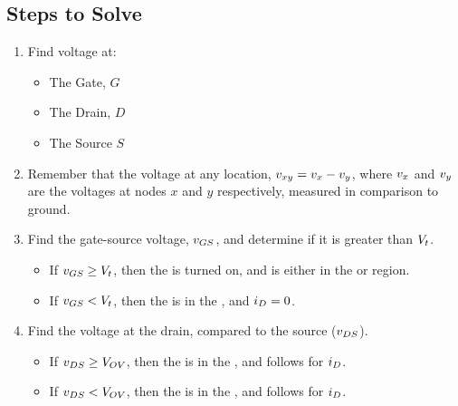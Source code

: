 \subsection{Steps to Solve}\label{subsec:Steps_to_Solve}
\begin{enumerate}[noitemsep]
\item Find voltage at:
  \begin{itemize}[noitemsep]
  \item The Gate, $G$
  \item The Drain, $D$
  \item The Source $S$
  \end{itemize}
\item Remember that the voltage at any location, $v_{xy} = v_{x} - v_{y}$, where $v_{x}$ and $v_{y}$ are the voltages at nodes $x$ and $y$ respectively, measured in comparison to ground.
\item Find the gate-source voltage, $v_{GS}$, and determine if it is greater than $V_{t}$.
  \begin{itemize}[noitemsep]
  \item If $v_{GS} \geq V_{t}$, then the  is turned on, and is either in the  or  region.
  \item If $v_{GS} < V_{t}$, then the  is in the , and $i_{D} = 0$.
  \end{itemize}
\item Find the voltage at the drain, compared to the source ($v_{DS}$).
  \begin{itemize}[noitemsep]
  \item If $v_{DS} \geq V_{OV}$, then the  is in the , and follows  for $i_{D}$.
  \item If $v_{DS} < V_{OV}$, then the  is in the , and follows  for $i_{D}$.
  \end{itemize}
\end{enumerate}

